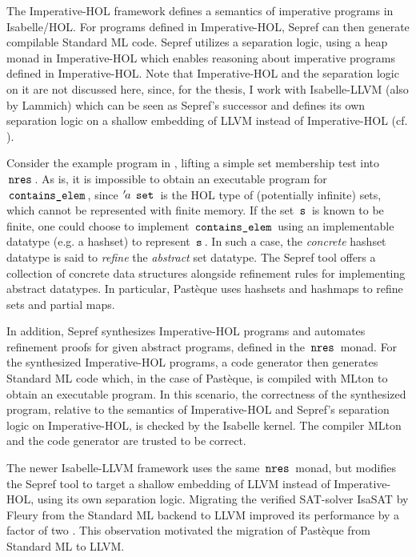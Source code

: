The Imperative-HOL framework \cite{Imperative-HOL} defines a semantics of imperative programs in Isabelle/HOL.
For programs defined in Imperative-HOL, Sepref can then generate compilable Standard ML code.
Sepref utilizes a separation logic, using a heap monad in Imperative-HOL \cite{Separation_Logic_Imperative_HOL-AFP} which enables reasoning about imperative programs defined in Imperative-HOL.
Note that Imperative-HOL and the separation logic on it are not discussed here, since, for the thesis, I work with Isabelle-LLVM \cite{isabelle-llvm} (also by Lammich) which can be seen as Sepref's successor and defines its own separation logic on a shallow embedding of LLVM instead of Imperative-HOL (cf. ).

Consider the example program in , lifting a simple set membership test into $\,\text{\ttfamily nres}\,$.
As is, it is impossible to obtain an executable program for $\,\text{\ttfamily contains\_elem}\,$, since ${\mskip2mu '\mskip-2mua} \; \,\text{\ttfamily set}\,$ is the HOL type of (potentially infinite) sets, which cannot be represented with finite memory.
If the set $\,\text{\ttfamily s}\,$ is known to be finite, one could choose to implement $\,\text{\ttfamily contains\_elem}\,$ using an implementable datatype (e.g. a hashset) to represent $\,\text{\ttfamily s}\,$.
In such a case, the \textit{concrete} hashset datatype is said to \textit{refine} the \textit{abstract} set datatype.
The Sepref tool offers a collection of concrete data structures alongside refinement rules for implementing abstract datatypes.
In particular, Pastèque uses hashsets and hashmaps to refine sets and partial maps.

In addition, Sepref synthesizes Imperative-HOL programs and automates refinement proofs for given abstract programs, defined in the $\,\text{\ttfamily nres}\,$ monad.
For the synthesized Imperative-HOL programs, a code generator then generates Standard ML code which, in the case of Pastèque, is compiled with MLton \cite{mlton,weeks-mlton-2006} to obtain an executable program.
In this scenario, the correctness of the synthesized program, relative to the semantics of Imperative-HOL and Sepref's separation logic on Imperative-HOL, is checked by the Isabelle kernel.
The compiler MLton and the code generator are trusted to be correct.

The newer Isabelle-LLVM framework uses the same $\,\text{\ttfamily nres}\,$ monad, but modifies the Sepref tool to target a shallow embedding of LLVM instead of Imperative-HOL, using its own separation logic.
Migrating the verified SAT-solver IsaSAT by Fleury \cite{isasat-sml} from the Standard ML backend to LLVM  improved its performance by a factor of two \cite{isasat-llvm}.
This observation motivated the migration of Pastèque from Standard ML to LLVM.


